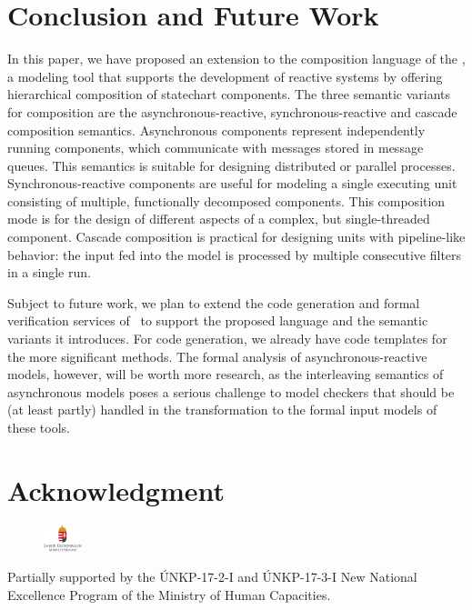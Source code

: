 \section{Conclusion and Future Work}
\label{sec:conclusion}
In this paper, we have proposed an extension to the composition language of the \framework, a modeling tool that supports the development of reactive systems by offering hierarchical composition of statechart components. The three semantic variants for composition are the asynchronous-reactive, synchronous-reactive and cascade composition semantics. Asynchronous components represent independently running components, which communicate with messages stored in message queues. This semantics is suitable for designing
distributed or parallel processes. Synchronous-reactive components are useful for modeling a single executing unit consisting of multiple, functionally decomposed components.
This composition mode is for the design of different aspects of a complex, but single-threaded component. Cascade composition is practical for designing units with pipeline-like behavior: the input fed into the model is processed by multiple consecutive filters in a single run.

Subject to future work, we plan to extend the code generation and formal verification services of \gamma\ to support the proposed language and the semantic variants it introduces. For code generation, we already have code templates for the more significant methods. The formal analysis of asynchronous-reactive models, however, will be worth more research, as the interleaving semantics of asynchronous models poses a serious challenge to model checkers that should be (at least partly) handled in the transformation to the formal input models of these tools.

\section*{Acknowledgment}
\vspace{-0.3cm}
\begin{figure}[!h]
	\centering
	\includegraphics[width=0.10\textwidth]{figures/unkp_logo.jpg}
\end{figure}
\vspace{-0.28cm}
Partially supported by the \'UNKP-17-2-I and \'UNKP-17-3-I New National Excellence Program of the Ministry of Human Capacities.
